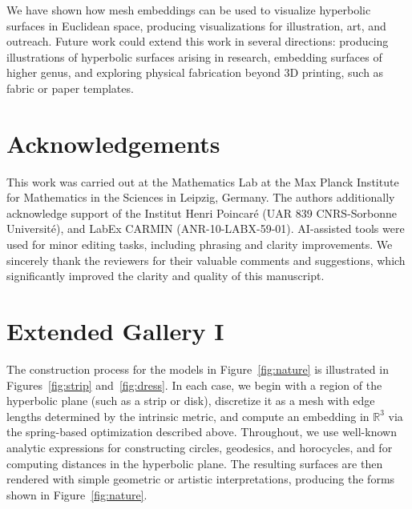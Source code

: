 \documentclass[letterpaper,11pt]{article}
\begin{document}
We have shown how mesh embeddings can be used to visualize hyperbolic surfaces in Euclidean space, producing visualizations for illustration, art, and outreach. Future work could extend this work in several directions: producing illustrations of hyperbolic surfaces arising in research, embedding surfaces of higher genus, and exploring physical fabrication beyond 3D printing, such as fabric or paper templates.

\section*{Acknowledgements}

This work was carried out at the Mathematics Lab at the Max Planck Institute for Mathematics in the Sciences in Leipzig, Germany. The authors additionally acknowledge support of the Institut Henri Poincaré (UAR 839 CNRS-Sorbonne Université), and LabEx CARMIN (ANR-10-LABX-59-01). AI-assisted tools were used for minor editing tasks, including phrasing and clarity improvements. We sincerely thank the reviewers for their valuable comments and suggestions, which significantly improved the clarity and quality of this manuscript.


{\setlength{\baselineskip}{13pt}
\raggedright



}


\clearpage
\appendix

\section{Extended Gallery I}
\label{app:extended-gallery-1}

The construction process for the models in Figure~\ref{fig:nature} is illustrated in Figures~\ref{fig:strip} and~\ref{fig:dress}. In each case, we begin with a region of the hyperbolic plane (such as a strip or disk), discretize it as a mesh with edge lengths determined by the intrinsic metric, and compute an embedding in $\mathbb{R}^3$ via the spring-based optimization described above. Throughout, we use well-known analytic expressions for constructing circles, geodesics, and horocycles, and for computing distances in the hyperbolic plane. The resulting surfaces are then rendered with simple geometric or artistic interpretations, producing the forms shown in Figure~\ref{fig:nature}.
\end{document}
